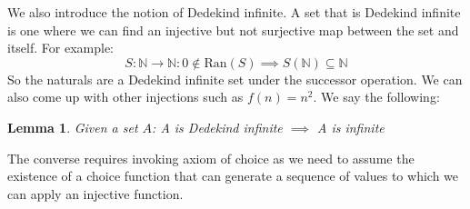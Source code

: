 \documentclass{article}
\newtheorem{lem}{Lemma}[section]
\begin{document}
We also introduce the notion of Dedekind infinite. A set that is Dedekind infinite is one where we can find an injective but not surjective map between the set and itself. For example:
\begin{equation*}
    S: \mathbb{N} \xrightarrow{} \mathbb{N}: 0 \notin \text{Ran}(S) \implies S(\mathbb{N}) \subseteq \mathbb{N}
\end{equation*}
So the naturals are a Dedekind infinite set under the successor operation. We can also come up with other injections such as $f(n) = n^2$. We say the following:
\begin{lem}
Given a set $A$: A is Dedekind infinite $\implies$ A is infinite
\end{lem}
The converse requires invoking axiom of choice as we need to assume the existence of a choice function that can generate a sequence of values to which we can apply an injective function.\\
\end{document}
